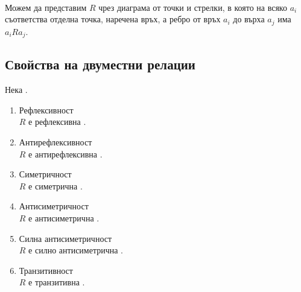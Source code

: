  \\
Можем да представим \(R\) чрез диаграма от точки и стрелки, в която на всяко \(a_i\) съответства отделна
точка, наречена връх, а ребро от връх \(a_i\) до върха \(a_j\) има \totw \(a_iRa_j\).


\subsection{Свойства на двуместни релации}
Нека .
\begin{enumerate}
    \item Рефлексивност \\
    \(R\) е рефлексивна \totw {}.

    \item Антирефлексивност \\
    \(R\) е антирефлексивна \totw {}.
    
    \item Симетричност \\
    \(R\) е симетрична \totw {}.

    \item Антисиметричност \\
    \(R\) е антисиметрична \totw {}.
    
    \item Силна антисиметричност \\
    \(R\) е силно антисиметрична \totw {}.
    
    \item Транзитивност \\
    \(R\) е транзитивна \totw {}.
    
\end{enumerate}

